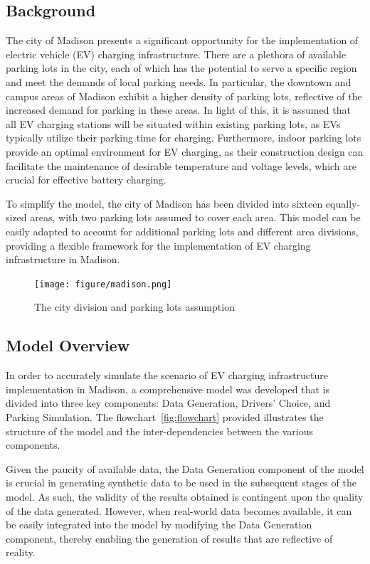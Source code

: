 \subsection{Background}


The city of Madison presents a significant opportunity for the implementation of electric vehicle (EV) charging infrastructure. There are a plethora of available parking lots in the city, each of which has the potential to serve a specific region and meet the demands of local parking needs. In particular, the downtown and campus areas of Madison exhibit a higher density of parking lots, reflective of the increased demand for parking in these areas. In light of this, it is assumed that all EV charging stations will be situated within existing parking lots, as EVs typically utilize their parking time for charging. Furthermore, indoor parking lots provide an optimal environment for EV charging, as their construction design can facilitate the maintenance of desirable temperature and voltage levels, which are crucial for effective battery charging.

To simplify the model, the city of Madison has been divided into sixteen equally-sized areas, with two parking lots assumed to cover each area. This model can be easily adapted to account for additional parking lots and different area divisions, providing a flexible framework for the implementation of EV charging infrastructure in Madison.
\begin{figure}[t]
    \texttt{[image: figure/madison.png]}
    \centering
    \caption{The city division and parking lots assumption}
    \label{fig:madison}
    \end{figure}



\subsection{Model Overview}
In order to accurately simulate the scenario of EV charging infrastructure implementation in Madison, a comprehensive model was developed that is divided into three key components: Data Generation, Drivers' Choice, and Parking Simulation. The flowchart~\ref{fig:flowchart} provided illustrates the structure of the model and the inter-dependencies between the various components.

Given the paucity of available data, the Data Generation component of the model is crucial in generating synthetic data to be used in the subsequent stages of the model. As such, the validity of the results obtained is contingent upon the quality of the data generated. However, when real-world data becomes available, it can be easily integrated into the model by modifying the Data Generation component, thereby enabling the generation of results that are reflective of reality.

